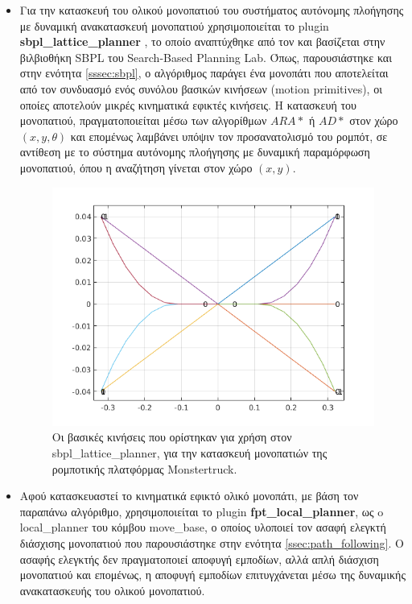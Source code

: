 \begin{itemize}
	\item Για την κατασκευή του ολικού μονοπατιού του συστήματος αυτόνομης πλοήγησης με δυναμική ανακατασκευή μονοπατιού χρησιμοποιείται το plugin \textbf{sbpl{\_}lattice{\_}planner} , το οποίο αναπτύχθηκε από τον \citeauthor{sbpl_lattice_planner}\cite{sbpl_lattice_planner} και βασίζεται στην βιλβιοθήκη SBPL \cite{sbpl_library} του Search-Based Planning Lab. Όπως, παρουσιάστηκε και στην ενότητα \ref{sssec:sbpl}, ο αλγόριθμος παράγει ένα μονοπάτι που αποτελείται από τον συνδυασμό ενός συνόλου βασικών κινήσεων (motion primitives), οι οποίες αποτελούν μικρές κινηματικά εφικτές κινήσεις. Η κατασκευή του μονοπατιού, πραγματοποιείται μέσω των αλγορίθμων $ARA*$ ή $AD*$ στον χώρο $(x,y,\theta)$ και επομένως λαμβάνει υπόψιν τον προσανατολισμό του ρομπότ, σε αντίθεση με το σύστημα αυτόνομης πλοήγησης με δυναμική παραμόρφωση μονοπατιού, όπου η αναζήτηση γίνεται στον χώρο $(x,y)$.

\begin{figure}[!ht]
	\centering
	\includegraphics[width=0.6\linewidth]{Chapters/Chapter4/Figures/motion_primitives.png}
	\caption{Οι βασικές κινήσεις που ορίστηκαν για χρήση στον sbpl{\_}lattice{\_}planner, για την κατασκευή μονοπατιών της ρομποτικής πλατφόρμας Monstertruck.}
	\label{fig:motion_primitives}
\end{figure}
		
	\item Αφού κατασκευαστεί το κινηματικά εφικτό ολικό μονοπάτι, με βάση τον παραπάνω αλγόριθμο, χρησιμοποιείται το plugin \textbf{fpt{\_}local{\_}planner}, ως o local{\_}planner του κόμβου move{\_}base, ο οποίος υλοποιεί τον ασαφή ελεγκτή διάσχισης μονοπατιού που παρουσιάστηκε στην ενότητα \ref{ssec:path_following}. Ο ασαφής ελεγκτής δεν πραγματοποιεί αποφυγή εμποδίων, αλλά απλή διάσχιση μονοπατιού και επομένως, η αποφυγή εμποδίων επιτυγχάνεται μέσω της δυναμικής ανακατασκευής του ολικού μονοπατιού.
\end{itemize}


